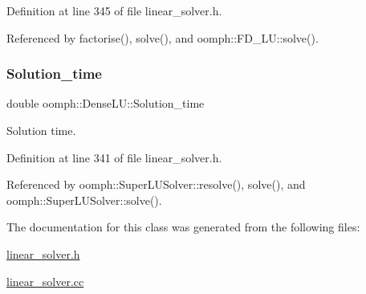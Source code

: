 Definition at line 345 of file linear\+\_\+solver.\+h.



Referenced by factorise(), solve(), and oomph\+::\+F\+D\+\_\+\+L\+U\+::solve().

\mbox{\label{classoomph_1_1DenseLU_abd10caf6beabb9c81fb7a8072212c6ad}} 
\subsubsection{\texorpdfstring{Solution\+\_\+time}{Solution\_time}}
{\footnotesize\ttfamily double oomph\+::\+Dense\+L\+U\+::\+Solution\+\_\+time\hspace{0.3cm}{\ttfamily [protected]}}



Solution time. 



Definition at line 341 of file linear\+\_\+solver.\+h.



Referenced by oomph\+::\+Super\+L\+U\+Solver\+::resolve(), solve(), and oomph\+::\+Super\+L\+U\+Solver\+::solve().



The documentation for this class was generated from the following files\+:\begin{DoxyCompactItemize}
\item 
\hyperlink{linear__solver_8h}{linear\+\_\+solver.\+h}\item 
\hyperlink{linear__solver_8cc}{linear\+\_\+solver.\+cc}\end{DoxyCompactItemize}
